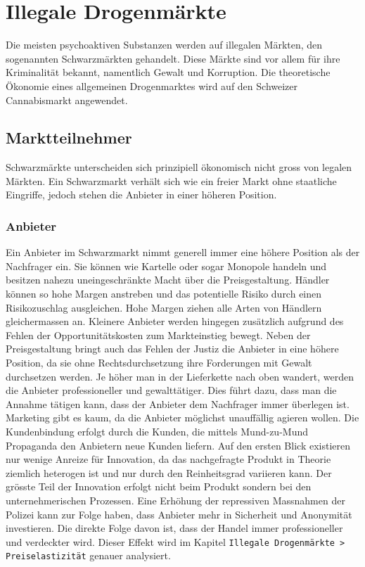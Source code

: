 \documentclass[../main.tex]{subfiles}
\begin{document}
 	\section{Illegale Drogenmärkte}
 	
 	Die meisten psychoaktiven Substanzen werden auf illegalen Märkten, den sogenannten Schwarzmärkten gehandelt.
	Diese Märkte sind vor allem für ihre Kriminalität bekannt, namentlich Gewalt und Korruption. 
	Die theoretische Ökonomie eines allgemeinen Drogenmarktes wird auf den Schweizer Cannabismarkt angewendet.

	
	
	\subsection{Marktteilnehmer}
	Schwarzmärkte unterscheiden sich prinzipiell ökonomisch nicht gross von legalen Märkten.
	Ein Schwarzmarkt verhält sich wie ein freier Markt ohne staatliche Eingriffe, jedoch stehen die Anbieter in einer höheren Position.
	
	
	\subsubsection{Anbieter}	
	Ein Anbieter im Schwarzmarkt nimmt generell immer eine höhere Position als der Nachfrager ein.
	Sie können wie Kartelle oder sogar Monopole handeln und besitzen nahezu uneingeschränkte Macht über die Preisgestaltung.
	Händler können so hohe Margen anstreben und das potentielle Risiko durch einen Risikozuschlag ausgleichen.
	Hohe Margen ziehen alle Arten von Händlern gleichermassen an.
	Kleinere Anbieter werden hingegen zusätzlich aufgrund des Fehlen der Opportunitätskosten zum Markteinstieg bewegt.
	Neben der Preisgestaltung bringt auch das Fehlen der Justiz die Anbieter in eine höhere Position, da sie ohne Rechtsdurchsetzung ihre Forderungen mit Gewalt durchsetzen werden.
	Je höher man in der Lieferkette nach oben wandert, werden die Anbieter professioneller und gewalttätiger. 
	Dies führt dazu, dass man die Annahme tätigen kann, dass der Anbieter dem Nachfrager immer überlegen ist.\\
	
	\noindent
	Marketing gibt es kaum, da die Anbieter möglichst unauffällig agieren wollen.
	Die Kundenbindung erfolgt durch die Kunden, die mittels Mund-zu-Mund Propaganda den Anbietern neue Kunden liefern.
	Auf den ersten Blick existieren nur wenige Anreize für Innovation, da das nachgefragte Produkt in Theorie ziemlich heterogen ist und nur durch den Reinheitsgrad variieren kann.		
	Der grösste Teil der Innovation erfolgt nicht beim Produkt sondern bei den unternehmerischen Prozessen. 
	Eine Erhöhung der repressiven Massnahmen der Polizei kann zur Folge haben, dass Anbieter mehr in Sicherheit und Anonymität investieren.
	Die direkte Folge davon ist, dass der Handel immer professioneller und verdeckter wird. 
	Dieser Effekt wird im Kapitel \texttt{Illegale Drogenmärkte > Preiselastizität} genauer analysiert.
	
\end{document}
